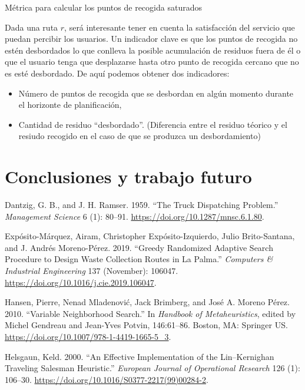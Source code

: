 \documentclass[
]{article}
\providecommand{\tightlist}{%
  \setlength{\itemsep}{0pt}\setlength{\parskip}{0pt}}
\begin{document}
Métrica para calcular los puntos de recogida saturados

Dada una ruta \(r\), será interesante tener en cuenta la satisfacción
del servicio que puedan percibir los usuarios. Un indicador clave es que
los puntos de recogida no estén desbordados lo que conlleva la posible
acumulación de residuos fuera de él o que el usuario tenga que
desplazarse hasta otro punto de recogida cercano que no es esté
desbordado. De aquí podemos obtener dos indicadores:

\begin{itemize}
\tightlist
\item
  Número de puntos de recogida que se desbordan en algún momento durante
  el horizonte de planificación,
\item
  Cantidad de residuo ``desbordado''. (Diferencia entre el residuo
  téorico y el resiudo recogido en el caso de que se produzca un
  desbordamiento)
\end{itemize}

\hypertarget{conclusiones-y-trabajo-futuro}{%
\section*{Conclusiones y trabajo
futuro}\label{conclusiones-y-trabajo-futuro}}

\hypertarget{refs}{}
\leavevmode\hypertarget{ref-dantzig_truck_1959}{}%
Dantzig, G. B., and J. H. Ramser. 1959. ``The Truck Dispatching
Problem.'' \emph{Management Science} 6 (1): 80--91.
\url{https://doi.org/10.1287/mnsc.6.1.80}.

\leavevmode\hypertarget{ref-exposito-marquez_greedy_2019}{}%
Expósito-Márquez, Airam, Christopher Expósito-Izquierdo, Julio
Brito-Santana, and J. Andrés Moreno-Pérez. 2019. ``Greedy Randomized
Adaptive Search Procedure to Design Waste Collection Routes in La
Palma.'' \emph{Computers \& Industrial Engineering} 137 (November):
106047. \url{https://doi.org/10.1016/j.cie.2019.106047}.

\leavevmode\hypertarget{ref-gendreau_variable_2010}{}%
Hansen, Pierre, Nenad Mladenović, Jack Brimberg, and José A. Moreno
Pérez. 2010. ``Variable Neighborhood Search.'' In \emph{Handbook of
Metaheuristics}, edited by Michel Gendreau and Jean-Yves Potvin,
146:61--86. Boston, MA: Springer US.
\url{https://doi.org/10.1007/978-1-4419-1665-5_3}.

\leavevmode\hypertarget{ref-helsgaun_effective_2000}{}%
Helsgaun, Keld. 2000. ``An Effective Implementation of the
Lin--Kernighan Traveling Salesman Heuristic.'' \emph{European Journal of
Operational Research} 126 (1): 106--30.
\url{https://doi.org/10.1016/S0377-2217(99)00284-2}.
\end{document}
